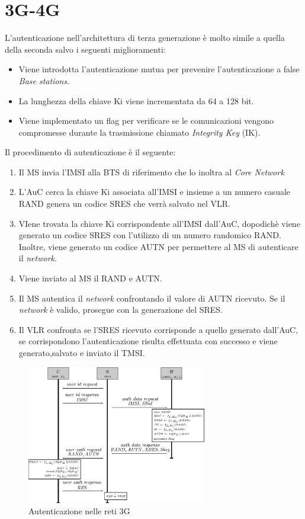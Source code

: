 \section{3G-4G}
L'autenticazione nell'architettura di terza generazione è molto simile a quella della seconda salvo i seguenti miglioramenti:
\begin{itemize}
    \item Viene introdotta l'autenticazione mutua per prevenire l'autenticazione a false \textit{Base stations}.
    \item La lunghezza della chiave Ki viene incrementata da 64 a 128 bit.
    \item Viene implementato un flag per verificare se le comunicazioni vengono compromesse durante la trasmissione chiamato \textit{Integrity Key} (IK).
\end{itemize}
Il procedimento di autenticazione è il seguente\cite{4g-auth}:
\begin{enumerate}
    \item Il MS invia l'IMSI alla BTS di riferimento che lo inoltra al \textit{Core Network}
    \item L'AuC cerca la chiave Ki associata all'IMSI e insieme a un numero casuale RAND genera un codice SRES che verrà
    salvato nel VLR.
    \item VIene trovata la chiave Ki corrispondente all'IMSI dall'AuC, dopodichè viene generato un codice SRES con l'utilizzo di un numero randomico RAND.
    Inoltre, viene generato un codice AUTN per permettere al MS di autenticare il \textit{network}.
    \item Viene inviato al MS il RAND e AUTN.
    \item Il MS autentica il \textit{network} confrontando il valore di AUTN ricevuto. Se il \textit{network} è valido, prosegue con la generazione del SRES.
    \item Il VLR confronta se l'SRES ricevuto corrisponde a quello generato dall'AuC, se corrispondono l'autenticazione risulta
    effettuata con successo e viene generato,salvato e inviato il TMSI.
\end{enumerate}
\begin{figure}[h]
    \centering
    \includegraphics[width=0.7\textwidth]{images/auth-3g.png}
    \caption{Autenticazione nelle reti 3G}
\end{figure}

